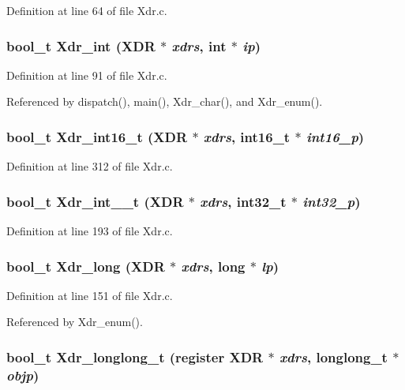 Definition at line 64 of file Xdr.c.
\subsubsection{\setlength{\rightskip}{0pt plus 5cm}bool\_\-t Xdr\_\-int (XDR $\ast$ {\em xdrs}, int $\ast$ {\em ip})}\label{Xdr_8c_a6}




Definition at line 91 of file Xdr.c.

Referenced by dispatch(), main(), Xdr\_\-char(), and Xdr\_\-enum().
\subsubsection{\setlength{\rightskip}{0pt plus 5cm}bool\_\-t Xdr\_\-int16\_\-t (XDR $\ast$ {\em xdrs}, int16\_\-t $\ast$ {\em int16\_\-p})}\label{Xdr_8c_a14}




Definition at line 312 of file Xdr.c.
\subsubsection{\setlength{\rightskip}{0pt plus 5cm}bool\_\-t Xdr\_\-int\_\_\-t (XDR $\ast$ {\em xdrs}, int32\_\-t $\ast$ {\em int32\_\-p})}\label{Xdr_8c_a10}




Definition at line 193 of file Xdr.c.
\subsubsection{\setlength{\rightskip}{0pt plus 5cm}bool\_\-t Xdr\_\-long (XDR $\ast$ {\em xdrs}, long $\ast$ {\em lp})}\label{Xdr_8c_a8}




Definition at line 151 of file Xdr.c.

Referenced by Xdr\_\-enum().
\subsubsection{\setlength{\rightskip}{0pt plus 5cm}bool\_\-t Xdr\_\-longlong\_\-t (register XDR $\ast$ {\em xdrs}, longlong\_\-t $\ast$ {\em objp})}\label{Xdr_8c_a27}




